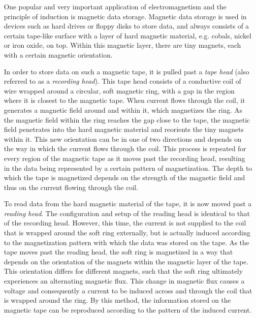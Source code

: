 
One popular and very important application of electromagnetism and the principle of induction is magnetic data storage. Magnetic data storage is used in devices such as hard drives or floppy disks to store data, and always consists of a certain tape-like surface with a layer of hard magnetic material, e.g. cobals, nickel or iron oxide, on top. Within this magnetic layer, there are tiny magnets, each with a certain magnetic orientation.


In order to store data on such a magnetic tape, it is pulled past a \emph{tape head} (also referred to as a \emph{recording head}). This tape head consists of a conductive coil of wire wrapped around a circular, soft magnetic ring, with a gap in the region where it is closest to the magnetic tape. When current flows through the coil, it generates a magnetic field around and within it, which magnetizes the ring. As the magnetic field within the ring reaches the gap close to the tape, the magnetic field penetrates into the hard magnetic material and reorients the tiny magnets within it. This new orientation can be in one of two directions and depends on the way in which the current flows through the coil. This process is repeated for every region of the magnetic tape as it moves past the recording head, resulting in the data being represented by a certain pattern of magnetization. The depth to which the tape is magnetized depends on the strength of the magnetic field and thus on the current flowing through the coil.


To read data from the hard magnetic material of the tape, it is now moved past a \emph{reading head}. The configuration and setup of the reading head is identical to that of the recording head. However, this time, the current is not supplied to the coil that is wrapped around the soft ring externally, but is actually induced according to the magnetization pattern with which the data was stored on the tape. As the tape moves past the reading head, the soft ring is magnetized in a way that depends on the orientation of the magnets within the magnetic layer of the tape. This orientation differs for different magnets, such that the soft ring ultimately experiences an alternating magnetic flux. This change in magnetic flux causes a voltage and consequently a current to be induced across and through the coil that is wrapped around the ring. By this method, the information stored on the magnetic tape can be reproduced according to the pattern of the induced current. 

